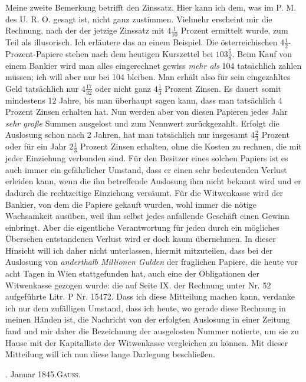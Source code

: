 Meine zweite Bemerkung betrifft den Zinssatz. Hier kann ich dem, was im P. M. des U. R. O. gesagt ist, nicht ganz zustimmen. Vielmehr erscheint mir die Rechnung, nach der der jetzige Zinssatz mit \(4\tfrac1{10}\) Prozent ermittelt wurde, zum Teil als illusorisch. Ich erläutere das an einem Beispiel. Die österreichischen \(4\tfrac12\)-Prozent-Papiere stehen nach dem heutigen Kurszettel bei \(103\tfrac58\). Beim Kauf von einem Bankier wird man alles eingerechnet gewiss \textit{mehr als} 104 tatsächlich zahlen müssen; ich will aber nur bei 104 bleiben. Man erhält also für sein eingezahltes Geld tatsächlich nur \(4\tfrac{17}{32}\) oder nicht ganz \(4\tfrac13\) Prozent Zinsen. Es dauert somit mindestens 12 Jahre, bis man überhaupt sagen kann, dass man tatsächlich 4 Prozent Zinsen erhalten hat. Nun werden aber von diesen Papieren jedes Jahr \textit{sehr große} Summen ausgelost und zum Nennwert zurückgezahlt. Erfolgt die Auslosung schon nach 2 Jahren, hat man tatsächlich nur insgesamt \(4\tfrac23\) Prozent oder für ein Jahr \(2\tfrac13\) Prozent Zinsen erhalten, ohne die Kosten zu rechnen, die mit jeder Einziehung verbunden sind. Für den Besitzer eines solchen Papiers ist es auch immer ein gefährlicher Umstand, dass er einen sehr bedeutenden Verlust erleiden kann, wenn die ihn betreffende Auslosung ihm nicht bekannt wird und er dadurch die rechtzeitige Einziehung versäumt. Für die Witwenkasse wird der Bankier, von dem die Papiere gekauft wurden, wohl immer die nötige Wachsamkeit ausüben, weil ihm selbst jedes anfallende Geschäft einen Gewinn einbringt. Aber die eigentliche Verantwortung für jeden durch ein mögliches Übersehen entstandenen Verlust wird er doch kaum übernehmen. In dieser Hinsicht will ich daher nicht unterlassen, hiermit mitzuteilen, dass bei der Auslosung von \textit{anderthalb Millionen Gulden} der fraglichen Papiere, die heute vor acht Tagen in Wien stattgefunden hat, auch eine der Obligationen der Witwenkasse gezogen wurde: die auf Seite IX. der Rechnung unter Nr. 52 aufgeführte Litr. P Nr. 15472. Dass ich diese Mitteilung machen kann, verdanke ich nur dem zufälligen Umstand, dass ich heute, wo gerade diese Rechnung in meinen Händen ist, die Nachricht von der erfolgten Auslosung in einer Zeitung fand und mir daher die Bezeichnung der ausgelosten Nummer notierte, um sie zu Hause mit der Kapitalliste der Witwenkasse vergleichen zu können. Mit dieser Mitteilung will ich nun diese lange Darlegung beschließen.

. Januar 1845.\hfill\textsc{Gauss.}

